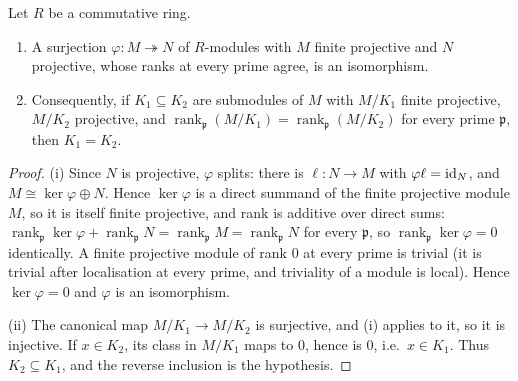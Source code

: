 \begin{lemma}
  \label{pa-lem:rankAtStalk_equal_quotients}
  \leanok

  Let \(R\) be a commutative ring.
  \begin{enumerate}
    \item A surjection \(\varphi \colon M \twoheadrightarrow N\) of \(R\)-modules with \(M\)
      finite projective and \(N\) projective, whose ranks at every prime agree, is an
      isomorphism.
    \item Consequently, if \(K_1 \subseteq K_2\) are submodules of \(M\) with \(M/K_1\)
      finite projective, \(M/K_2\) projective, and
      \(\operatorname{rank}_{\mathfrak p}(M/K_1) = \operatorname{rank}_{\mathfrak p}(M/K_2)\)
      for every prime \(\mathfrak p\), then \(K_1 = K_2\).
  \end{enumerate}
\end{lemma}
\begin{proof}
  \leanok
  (i) Since \(N\) is projective, \(\varphi\) splits: there is \(\ell \colon N \to M\) with
  \(\varphi \ell = \operatorname{id}_N\), and \(M \cong \ker\varphi \oplus N\). Hence \(\ker \varphi\) is
  a direct summand of the finite projective module \(M\), so it is itself finite
  projective, and rank is additive over direct sums:
  \(\operatorname{rank}_{\mathfrak p} \ker\varphi + \operatorname{rank}_{\mathfrak p} N =
  \operatorname{rank}_{\mathfrak p} M = \operatorname{rank}_{\mathfrak p} N\) for every
  \(\mathfrak p\), so \(\operatorname{rank}_{\mathfrak p}\ker\varphi = 0\) identically. A
  finite projective module of rank \(0\) at every prime is trivial (it is trivial after
  localisation at every prime, and triviality of a module is local). Hence
  \(\ker \varphi = 0\) and \(\varphi\) is an isomorphism.

  (ii) The canonical map \(M/K_1 \to M/K_2\) is surjective, and (i) applies to it, so it is
  injective. If \(x \in K_2\), its class in \(M/K_1\) maps to \(0\), hence is \(0\), i.e.\
  \(x \in K_1\). Thus \(K_2 \subseteq K_1\), and the reverse inclusion is the hypothesis.
\end{proof}

